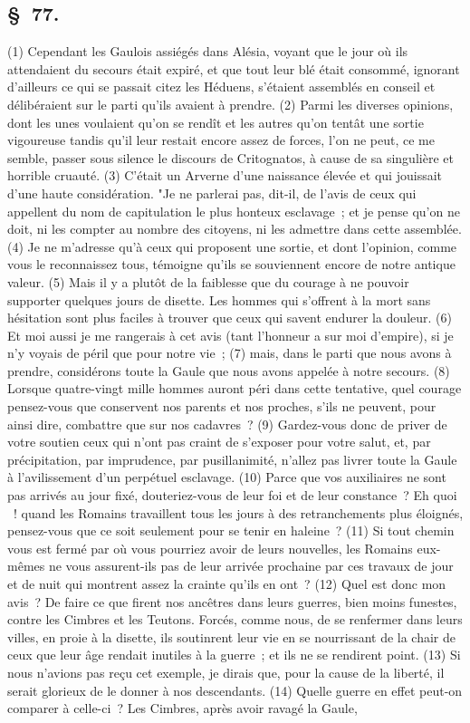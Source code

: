 \documentclass[french,twoside]{book} %
\begin{document}
\subsection[{§ 77.}]{ \textsc{§ 77.} }
\noindent (1) Cependant les Gaulois assiégés dans Alésia, voyant que le jour où ils attendaient du secours était expiré, et que tout leur blé était consommé, ignorant d’ailleurs ce qui se passait citez les Héduens, s’étaient assemblés en conseil et délibéraient sur le parti qu’ils avaient à prendre. (2) Parmi les diverses opinions, dont les unes voulaient qu’on se rendît et les autres qu’on tentât une sortie vigoureuse tandis qu’il leur restait encore assez de forces, l’on ne peut, ce me semble, passer sous silence le discours de Critognatos, à cause de sa singulière et horrible cruauté. (3) C'était un Arverne d’une naissance élevée et qui jouissait d’une haute considération. "Je ne parlerai pas, dit-il, de l’avis de ceux qui appellent du nom de capitulation le plus honteux esclavage ; et je pense qu’on ne doit, ni les compter au nombre des citoyens, ni les admettre dans cette assemblée. (4) Je ne m’adresse qu’à ceux qui proposent une sortie, et dont l’opinion, comme vous le reconnaissez tous, témoigne qu’ils se souviennent encore de notre antique valeur. (5) Mais il y a plutôt de la faiblesse que du courage à ne pouvoir supporter quelques jours de disette. Les hommes qui s’offrent à la mort sans hésitation sont plus faciles à trouver que ceux qui savent endurer la douleur. (6) Et moi aussi je me rangerais à cet avis (tant l’honneur a sur moi d’empire), si je n’y voyais de péril que pour notre vie ; (7) mais, dans le parti que nous avons à prendre, considérons toute la Gaule que nous avons appelée à notre secours. (8) Lorsque quatre-vingt mille hommes auront péri dans cette tentative, quel courage pensez-vous que conservent nos parents et nos proches, s’ils ne peuvent, pour ainsi dire, combattre que sur nos cadavres ? (9) Gardez-vous donc de priver de votre soutien ceux qui n’ont pas craint de s’exposer pour votre salut, et, par précipitation, par imprudence, par pusillanimité, n’allez pas livrer toute la Gaule à l’avilissement d’un perpétuel esclavage. (10) Parce que vos auxiliaires ne sont pas arrivés au jour fixé, douteriez-vous de leur foi et de leur constance ? Eh quoi  ! quand les Romains travaillent tous les jours à des retranchements plus éloignés, pensez-vous que ce soit seulement pour se tenir en haleine ? (11) Si tout chemin vous est fermé par où vous pourriez avoir de leurs nouvelles, les Romains eux-mêmes ne vous assurent-ils pas de leur arrivée prochaine par ces travaux de jour et de nuit qui montrent assez la crainte qu’ils en ont ? (12) Quel est donc mon avis ? De faire ce que firent nos ancêtres dans leurs guerres, bien moins funestes, contre les Cimbres et les Teutons. Forcés, comme nous, de se renfermer dans leurs villes, en proie à la disette, ils soutinrent leur vie en se nourrissant de la chair de ceux que leur âge rendait inutiles à la guerre ; et ils ne se rendirent point. (13) Si nous n’avions pas reçu cet exemple, je dirais que, pour la cause de la liberté, il serait glorieux de le donner à nos descendants. (14) Quelle guerre en effet peut-on comparer à celle-ci ? Les Cimbres, après avoir ravagé la Gaule, 
\end{document}
